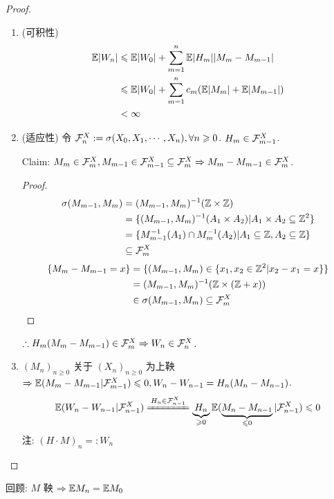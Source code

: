 \begin{proof}
    \begin{enumerate}
        \item (可积性)
        \[
        \begin{aligned}
            \mathbb E |W_n| &\leqslant \mathbb E |W_0|+\sum_{m=1}^n \mathbb E |H_m||M_m-M_{m-1}|\\
            &\leqslant \mathbb E |W_0|+\sum_{m=1}^n c_m (\mathbb E |M_m|+ \mathbb E |M_{m-1}|)\\
            &<\infty
        \end{aligned}
        \]
        \item (适应性) 令 $\mathcal{F}_n^X:=\sigma(X_0,X_1,\cdots,X_n), \forall n\geqslant 0$. $H_m\in \mathcal{F}_{m-1}^X$.
        
        Claim: $M_m\in \mathcal{F}_m^X, M_{m-1}\in \mathcal{F}_{m-1}^X\subseteq \mathcal{F}_m^X \Rightarrow M_m-M_{m-1}\in \mathcal{F}_m^X$.
        \begin{proof}
        \[
        \begin{aligned}
            \sigma(M_{m-1},M_m) &=(M_{m-1}, M_m)^{-1}(\mathbb{Z}\times \mathbb{Z})\\
            &=\{(M_{m-1}, M_m)^{-1}(A_1\times A_2)|A_1\times A_2\subseteq \mathbb{Z}^2\}\\
            &=\{M_{m-1}^{-1}(A_1)\cap M_m^{-1}(A_2)|A_1\subseteq \mathbb{Z}, A_2\subseteq \mathbb{Z}\}\\
            &\subseteq \mathcal{F}_m^X
        \end{aligned}
        \]
        \[
        \begin{aligned}
            \{M_m-M_{m-1}=x\} &=\{(M_{m-1}, M_m)\in \{x_1,x_2\in \mathbb{Z}^2|x_2-x_1=x\}\}\\
            &=(M_{m-1}, M_m)^{-1}(\mathbb{Z}\times (\mathbb{Z}+x))\\
            &\in \sigma(M_{m-1}, M_m)\subseteq \mathcal{F}_m^X
        \end{aligned}
        \]
        \end{proof}
        $\therefore H_m(M_m-M_{m-1})\in \mathcal{F}_m^X \Rightarrow W_n\in \mathcal{F}_n^X$.
        \item $(M_n)_{n\geq 0}$ 关于 $(X_n)_{n\geq 0}$ 为上鞅 $\Rightarrow \mathbb E(M_m-M_{m-1}|\mathcal{F}_{m-1}^X)\leqslant 0, W_n-W_{n-1}=H_n(M_n-M_{n-1})$.
        \[
        \EE(W_n-W_{n-1}|\CF_{n-1}^X)\xlongequal{H_n\in \CF_{n-1}^X}\underbrace{H_n}_{\geq 0}\EE(\underbrace{M_n-M_{n-1}}_{\leq 0}|\CF_{n-1}^X)\leq 0
        \]
        注: $(H\cdot M)_n=:W_n$
    \end{enumerate}
\end{proof}

回顾: $M$ 鞅 $\Rightarrow \mathbb E M_n=\mathbb E M_0$

